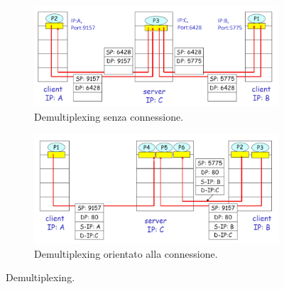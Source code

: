 \documentclass[11pt, italian, openany]{book}
\begin{document}
\begin{sloppypar}
\begin{figure}[!h]
	\begin{subfigure}[t]{0.49 \linewidth} \centering
		\includegraphics[scale=0.24]{images/demultiplexing-senza-connessione.png}
		\caption{Demultiplexing senza connessione.}
	\end{subfigure}
	\begin{subfigure}[t]{0.49 \linewidth} \centering
		\includegraphics[scale=0.24]{images/demultiplexing-orientato-alla-connessione.png}
		\caption{Demultiplexing orientato alla connessione.}
	\end{subfigure}
	\caption{Demultiplexing.}
	\label{fig:demultiplexing}
\end{figure}


\end{sloppypar}
\end{document}
